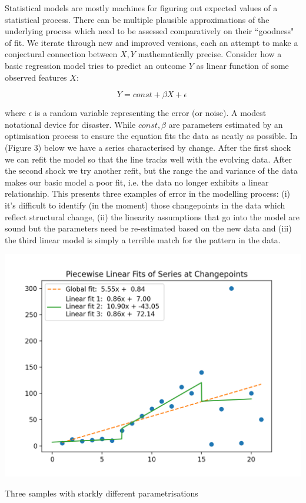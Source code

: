 \documentclass{tufte-handout}
\begin{document}
\noindent Statistical models are mostly machines for figuring out expected values of a statistical process. There can be multiple plausible approximations of the underlying process which need to be assessed comparatively on their ``goodness" of fit. We iterate through new and improved versions, each an attempt to make a conjectural connection between $ X, Y $ mathematically precise. Consider how a basic regression model tries to predict an outcome $Y$ as linear function of some observed features $X$:

$$ Y = const + \beta X + \epsilon  \ $$

\noindent where $\epsilon$ is a random variable representing the error (or noise). A modest notational device for disaster. While $const, \beta$ are parameters estimated by an optimisation process to ensure the equation fits the data as neatly as possible. In (Figure 3) below we have a series characterised by change. After the first shock we can refit the model so that the line tracks well with the evolving data. After the second shock we try another refit, but the range the and variance of the data makes our basic model a poor fit, i.e. the data no longer exhibits a linear relationship. This presents three examples of error in the modelling process: (i) it's difficult to identify (in the moment) those changepoints in the data which reflect structural change, (ii)  the linearity assumptions that go into the model are sound but the parameters need be re-estimated based on the new data and (iii) the third linear model is simply a terrible match for the pattern in the data.
\linebreak 
\begin{marginfigure}
  \includegraphics[width=\linewidth]{../Expectation/Plots/piecewise_linear_fits.png}
  \caption{Three samples with starkly different parametrisations}
\end{marginfigure}
\end{document}
